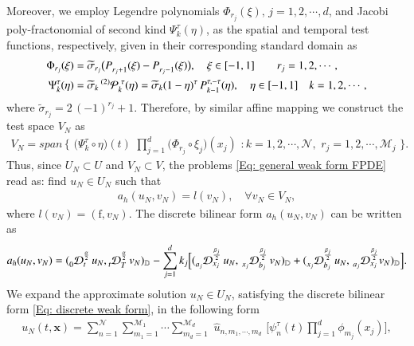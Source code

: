 Moreover, we employ Legendre polynomials $\Phi_{r_j}(\xi), \, j=1,2,\cdots,d$, and Jacobi poly-fractonomial of second kind $\Psi^{\tau}_k(\eta)$, as the spatial and temporal test functions, respectively, given in their corresponding standard domain as
%
\begin{align}
\label{Eq: Spatial Test}
%
\Phi_{r_j} ( \xi )  & =  \widetilde{\sigma}_{r_j} \big{(} P_{r_j+1}^{} (\xi) - P_{r_j-1}^{} (\xi)\big{)},  \quad  \xi \in [-1,1]  \qquad r_j =1,2,\cdots ,
%
\\
\label{Eq: Temporal Test}
\Psi^{\tau}_k(\eta) & = \widetilde{\sigma}_{k} \prescript{(2)}{}{ \mathcal{P}}_{k}^{\,\,\tau}(\eta) = \widetilde{\sigma}_{k} (1-\eta)^{\tau}\, P_{k-1}^{\tau,-\tau} (\eta), \quad \eta\in [-1,1]  \quad k=1,2,\cdots,
%
\end{align}
%
where $ \widetilde{\sigma}_{r_j} = 2\,(-1)^{r_j} + 1$. Therefore, by similar affine mapping we construct the test space $V_N$ as
%
\begin{align}
\label{Eq: Test Space: PG}
V_N = span \, \Big\{  \,\,
\Big(\Psi^{\tau}_k \circ \eta\Big)(t) \,\,
\prod_{j=1}^{d} \Big( \Phi^{}_{r_j} \circ \xi_j\Big)(x_j) \,\,
: k = 1,2, \cdots, \mathcal{N}, \,\, r_j= 1,2, \cdots, \mathcal{M}_j
\,\, \Big\}.
%
\end{align}
%
Thus, since $U_N \subset U$ and $V_N \subset  V$, the problems \eqref{Eq: general weak form FPDE} read as: find $u_N \in U_N$ such that
%
\begin{align}
\label{Eq: PG method FPDE}
%
a_h(u_N,v_N) = l(v_N), \quad \forall v_N \in V_N,
%
\end{align}
%
where $l(v_N) = (\text{f},v_N)$. The discrete bilinear form $a_h(u_N,v_N)$ can be written as 
%
\begin{align}
%
\label{Eq: discrete weak form}
a_h(u_N,v_N)
=(\prescript{}{0}{\mathcal{D}}_{t}^{\frac{\alpha}{2}}\, u_N, \prescript{}{t}{\mathcal{D}}_{T}^{\frac{\alpha}{2}}\, v_N )_{\mathbb{D}} 
%
-\sum_{j=1}^{d} 
k_{j} \Big[ ( \prescript{}{a_j}{\mathcal{D}}_{x_j}^{\frac{\beta_j}{2}}\, u_N ,\, \prescript{}{x_j}{\mathcal{D}}_{b_j}^{\frac{\beta_j}{2}}\, v_N )_{\mathbb{D}}
+ ( \prescript{}{x_j}{\mathcal{D}}_{b_j}^{\frac{\beta_j}{2}}\, u_N , \, \prescript{}{a_j}{\mathcal{D}}_{x_j}^{\frac{\beta_j}{2}} v_N)_{\mathbb{D}}
\Big].
%
\end{align}
%
We expand the approximate solution $u_N \in U_N$, satisfying the discrete bilinear form \eqref{Eq: discrete weak form}, in the following form
%
\begin{align}
\label{Eq: PG expansion}
%
u_{N}(t,\textbf{x}) = 
\sum_{n=1}^\mathcal{N}
\sum_{m_1=1}^{\mathcal{M}_1}
\cdots 
\sum_{m_d= 1}^{\mathcal{M}_d}  \,\,
\hat u_{ n,m_1,\cdots,m_d} \,\,
\Big[\psi^{\tau}_n(t)
\prod_{j=1}^{d} \phi^{}_{m_j}(x_j)
\Big] ,
%
\end{align}
